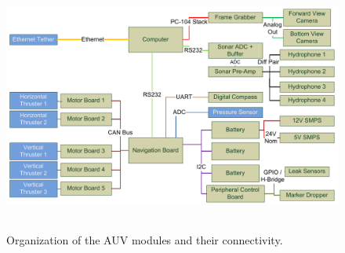 \begin{figure}
\begin{center}
 \includegraphics[height=3.3in]{fig/visio.pdf}
\caption{Organization of the AUV modules and their connectivity.}\label{organi}
\end{center}
\end{figure}


